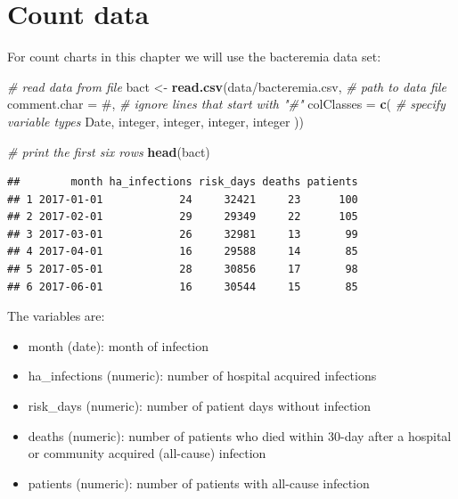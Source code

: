 \documentclass[
]{book}
\newenvironment{Shaded}{\begin{snugshade}}{\end{snugshade}}
\newcommand{\AttributeTok}[1]{\textcolor[rgb]{0.13,0.29,0.53}{#1}}
\newcommand{\CommentTok}[1]{\textcolor[rgb]{0.56,0.35,0.01}{\textit{#1}}}
\newcommand{\FunctionTok}[1]{\textcolor[rgb]{0.13,0.29,0.53}{\textbf{#1}}}
\newcommand{\NormalTok}[1]{#1}
\newcommand{\OtherTok}[1]{\textcolor[rgb]{0.56,0.35,0.01}{#1}}
\newcommand{\StringTok}[1]{\textcolor[rgb]{0.31,0.60,0.02}{#1}}
\providecommand{\tightlist}{%
  \setlength{\itemsep}{0pt}\setlength{\parskip}{0pt}}
\begin{document}
\section{Count data}\label{count-data}

For count charts in this chapter we will use the bacteremia data set:

\begin{Shaded}
\begin{Highlighting}[]
\CommentTok{\# read data from file}
\NormalTok{bact }\OtherTok{\textless{}{-}} \FunctionTok{read.csv}\NormalTok{(}\StringTok{\textquotesingle{}data/bacteremia.csv\textquotesingle{}}\NormalTok{,  }\CommentTok{\# path to data file}
                 \AttributeTok{comment.char =} \StringTok{\textquotesingle{}\#\textquotesingle{}}\NormalTok{,     }\CommentTok{\# ignore lines that start with "\#"}
                 \AttributeTok{colClasses   =} \FunctionTok{c}\NormalTok{(       }\CommentTok{\# specify variable types}
                   \StringTok{\textquotesingle{}Date\textquotesingle{}}\NormalTok{,}
                   \StringTok{\textquotesingle{}integer\textquotesingle{}}\NormalTok{,}
                   \StringTok{\textquotesingle{}integer\textquotesingle{}}\NormalTok{,}
                   \StringTok{\textquotesingle{}integer\textquotesingle{}}\NormalTok{,}
                   \StringTok{\textquotesingle{}integer\textquotesingle{}}
\NormalTok{                 ))}

\CommentTok{\# print the first six rows}
\FunctionTok{head}\NormalTok{(bact)}
\end{Highlighting}
\end{Shaded}

\begin{verbatim}
##        month ha_infections risk_days deaths patients
## 1 2017-01-01            24     32421     23      100
## 2 2017-02-01            29     29349     22      105
## 3 2017-03-01            26     32981     13       99
## 4 2017-04-01            16     29588     14       85
## 5 2017-05-01            28     30856     17       98
## 6 2017-06-01            16     30544     15       85
\end{verbatim}

The variables are:

\begin{itemize}
\tightlist
\item
  month (date): month of infection
\item
  ha\_infections (numeric): number of hospital acquired infections
\item
  risk\_days (numeric): number of patient days without infection
\item
  deaths (numeric): number of patients who died within 30-day after a hospital or community acquired (all-cause) infection
\item
  patients (numeric): number of patients with all-cause infection
\end{itemize}
\end{document}
